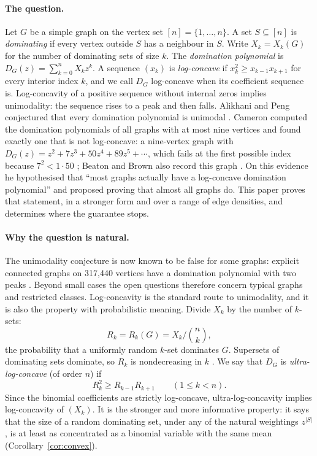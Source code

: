 \documentclass[11pt]{article}
\theoremstyle{remark}
\begin{document}
\paragraph{The question.} Let $G$ be a simple graph on the vertex set $[n]=\{1,\dots,n\}$. A set $S\subseteq[n]$ is \emph{dominating} if every vertex outside $S$ has a neighbour in $S$. Write $X_k=X_k(G)$ for the number of dominating sets of size $k$. The \emph{domination polynomial} is $D_G(z)=\sum_{k=0}^nX_kz^k$. A sequence $(x_k)$ is \emph{log-concave} if $x_k^2\ge x_{k-1}x_{k+1}$ for every interior index $k$, and we call $D_G$ log-concave when its coefficient sequence is. Log-concavity of a positive sequence without internal zeros implies unimodality: the sequence rises to a peak and then falls. Alikhani and Peng conjectured that every domination polynomial is unimodal \cite{AP}. Cameron computed the domination polynomials of all graphs with at most nine vertices and found exactly one that is not log-concave: a nine-vertex graph with $D_G(z)=z^2+7z^3+50z^4+89z^5+\cdots$, which fails at the first possible index because $7^2<1\cdot 50$ \cite[Section~6.5, pp.~96--97]{Cameron}; Beaton and Brown also record this graph \cite[Section~1]{BB}. On this evidence he hypothesised that ``most graphs actually have a log-concave domination polynomial'' and proposed proving that almost all graphs do. This paper proves that statement, in a stronger form and over a range of edge densities, and determines where the guarantee stops.

\paragraph{Why the question is natural.} The unimodality conjecture is now known to be false for some graphs: explicit connected graphs on 317,440 vertices have a domination polynomial with two peaks \cite{EPpeaks}. Beyond small cases the open questions therefore concern typical graphs and restricted classes. Log-concavity is the standard route to unimodality, and it is also the property with probabilistic meaning. Divide $X_k$ by the number of $k$-sets:
\[
 R_k=R_k(G)=X_k\Big/\binom nk ,
\]
the probability that a uniformly random $k$-set dominates $G$. Supersets of dominating sets dominate, so $R_k$ is nondecreasing in $k$ \cite[Section~3]{BB}. We say that $D_G$ is \emph{ultra-log-concave} (of order $n$) if
\begin{equation}
 R_k^2\ge R_{k-1}R_{k+1}\qquad(1\le k<n).
 \label{eq:ulc}
\end{equation}
Since the binomial coefficients are strictly log-concave, ultra-log-concavity implies log-concavity of $(X_k)$. It is the stronger and more informative property: it says that the size of a random dominating set, under any of the natural weightings $z^{|S|}$, is at least as concentrated as a binomial variable with the same mean (Corollary~\ref{cor:convex}).
\end{document}
